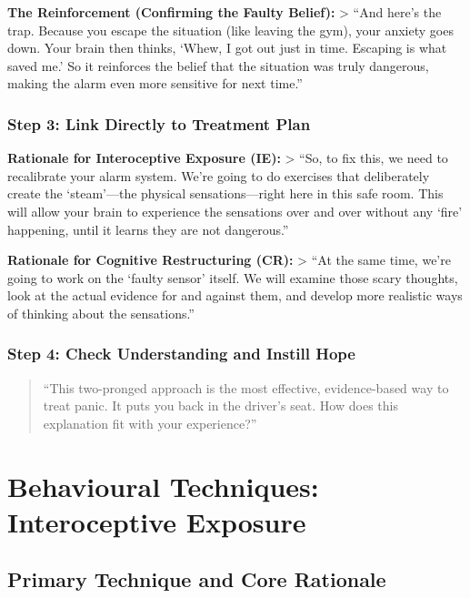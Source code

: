 \documentclass[
  american,
  11pt,
  11pt,
  letterpaper,
  onecolumn]{article}
\begin{document}
\textbf{The Reinforcement (Confirming the Faulty Belief):}
\textgreater{} ``And here's the trap. Because you escape the situation
(like leaving the gym), your anxiety goes down. Your brain then thinks,
`Whew, I got out just in time. Escaping is what saved me.' So it
reinforces the belief that the situation was truly dangerous, making the
alarm even more sensitive for next time.''

\subsubsection{Step 3: Link Directly to Treatment
Plan}\label{step-3-link-directly-to-treatment-plan}

\textbf{Rationale for Interoceptive Exposure (IE):} \textgreater{} ``So,
to fix this, we need to recalibrate your alarm system. We're going to do
exercises that deliberately create the `steam'---the physical
sensations---right here in this safe room. This will allow your brain to
experience the sensations over and over without any `fire' happening,
until it learns they are not dangerous.''

\textbf{Rationale for Cognitive Restructuring (CR):} \textgreater{} ``At
the same time, we're going to work on the `faulty sensor' itself. We
will examine those scary thoughts, look at the actual evidence for and
against them, and develop more realistic ways of thinking about the
sensations.''

\subsubsection{Step 4: Check Understanding and Instill
Hope}\label{step-4-check-understanding-and-instill-hope}

\begin{quote}
``This two-pronged approach is the most effective, evidence-based way to
treat panic. It puts you back in the driver's seat. How does this
explanation fit with your experience?''
\end{quote}

\section{Behavioural Techniques: Interoceptive
Exposure}\label{behavioural-techniques-interoceptive-exposure}

\subsection{Primary Technique and Core
Rationale}\label{primary-technique-and-core-rationale}
\end{document}
